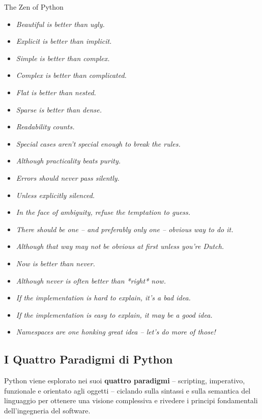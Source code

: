 \documentclass[12pt]{extarticle}
\begin{document}
\begin{cbox}{The Zen of Python}
\begin{itemize}
    \item \textit{Beautiful is better than ugly.}
    \item \textit{Explicit is better than implicit.}
    \item \textit{Simple is better than complex.}
    \item \textit{Complex is better than complicated.}
    \item \textit{Flat is better than nested.}
    \item \textit{Sparse is better than dense.}
    \item \textit{Readability counts.}
    \item \textit{Special cases aren't special enough to break the rules.}
    \item \textit{Although practicality beats purity.}
    \item \textit{Errors should never pass silently.}
    \item \textit{Unless explicitly silenced.}
    \item \textit{In the face of ambiguity, refuse the temptation to guess.}
    \item \textit{There should be one -- and preferably only one -- obvious way to do it.}
    \item \textit{Although that way may not be obvious at first unless you're Dutch.}
    \item \textit{Now is better than never.}
    \item \textit{Although never is often better than *right* now.}
    \item \textit{If the implementation is hard to explain, it's a bad idea.}
    \item \textit{If the implementation is easy to explain, it may be a good idea.}
    \item \textit{Namespaces are one honking great idea -- let's do more of those!}
\end{itemize}
\end{cbox}

\subsection{I Quattro Paradigmi di Python}

\noindent Python viene esplorato nei suoi \textbf{quattro paradigmi} -- scripting, imperativo, funzionale e orientato agli oggetti -- ciclando sulla sintassi e sulla semantica del linguaggio per ottenere una visione complessiva e rivedere i principi fondamentali dell'ingegneria del software.
\end{document}
